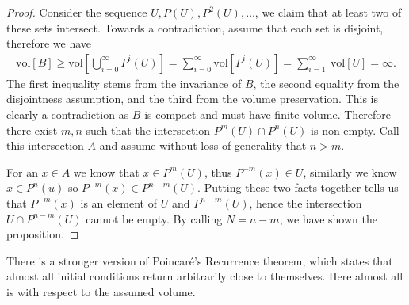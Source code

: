 \begin{proof}
	Consider the sequence $U, P(U), P^{2}(U),\ldots$, we claim that at least two of these sets intersect. Towards a contradiction, assume that each set is disjoint, therefore we have
	\begin{align}
		\textrm{vol} [B] \geq  \textrm{vol} \left[ \bigcup_{i=0}^{\infty }P^{i}(U) \right] = \sum_{i=0}^{\infty }  \textrm{vol} \left[ P^{i}(U) \right] = \sum_{i=1}^{\infty } \ \textrm{vol} [U]= \infty .
	\end{align}
	The first inequality stems from the invariance of $B$, the second equality from the disjointness assumption, and the third from the volume preservation. This is clearly a contradiction as $B$ is compact and must have finite volume. Therefore there exist $m,n$ such that the intersection $P^{m}(U)\cap P^{n}(U)$ is non-empty. Call this intersection $A$ and assume without loss of generality that $n>m$. 

	For an $x \in A $ we know that $x\in P^{m}(U) $, thus $P^{-m}(x) \in U $, similarly we know $x\in P^{n}(u) $ so $P^{-m}(x)\in P^{n-m}(U) $. Putting these two facts together tells us that $P^{-m}(x) $ is an element of $U $ and $P^{n-m}(U)$, hence the intersection $U\cap P^{n-m}(U)$ cannot be empty. By calling $N=n-m$, we have shown the proposition.
\end{proof}
\begin{remark}[]
	There is a stronger version of Poincaré's Recurrence theorem, which states that almost all initial conditions return arbitrarily close to themselves. Here almost all is with respect to the assumed volume.
\end{remark}

